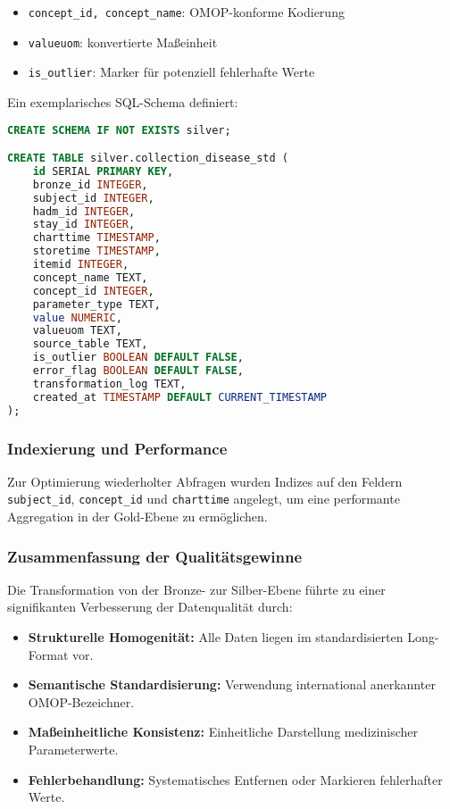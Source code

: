 \documentclass[12pt]{article}
\begin{document}
\begin{itemize}
    \item \texttt{concept\_id, concept\_name}: OMOP-konforme Kodierung
    \item \texttt{valueuom}: konvertierte Maßeinheit
    \item \texttt{is\_outlier}: Marker für potenziell fehlerhafte Werte
\end{itemize}

Ein exemplarisches SQL-Schema definiert:

\begin{lstlisting}[language=SQL, caption={Erstellen der Silber-Tabelle}]
CREATE SCHEMA IF NOT EXISTS silver;

CREATE TABLE silver.collection_disease_std (
    id SERIAL PRIMARY KEY,
    bronze_id INTEGER,
    subject_id INTEGER,
    hadm_id INTEGER,
    stay_id INTEGER,
    charttime TIMESTAMP,
    storetime TIMESTAMP,
    itemid INTEGER,
    concept_name TEXT,
    concept_id INTEGER,
    parameter_type TEXT,
    value NUMERIC,
    valueuom TEXT,
    source_table TEXT,
    is_outlier BOOLEAN DEFAULT FALSE,
    error_flag BOOLEAN DEFAULT FALSE,
    transformation_log TEXT,
    created_at TIMESTAMP DEFAULT CURRENT_TIMESTAMP
);
\end{lstlisting}

\subsubsection{Indexierung und Performance}

Zur Optimierung wiederholter Abfragen wurden Indizes auf den Feldern \texttt{subject\_id}, \texttt{concept\_id} und \texttt{charttime} angelegt, um eine performante Aggregation in der Gold-Ebene zu ermöglichen.

\subsubsection{Zusammenfassung der Qualitätsgewinne}

Die Transformation von der Bronze- zur Silber-Ebene führte zu einer signifikanten Verbesserung der Datenqualität durch:

\begin{itemize}
    \item \textbf{Strukturelle Homogenität:} Alle Daten liegen im standardisierten Long-Format vor.
    \item \textbf{Semantische Standardisierung:} Verwendung international anerkannter OMOP-Bezeichner.
    \item \textbf{Maßeinheitliche Konsistenz:} Einheitliche Darstellung medizinischer Parameterwerte.
    \item \textbf{Fehlerbehandlung:} Systematisches Entfernen oder Markieren fehlerhafter Werte.
\end{itemize}
\end{document}
